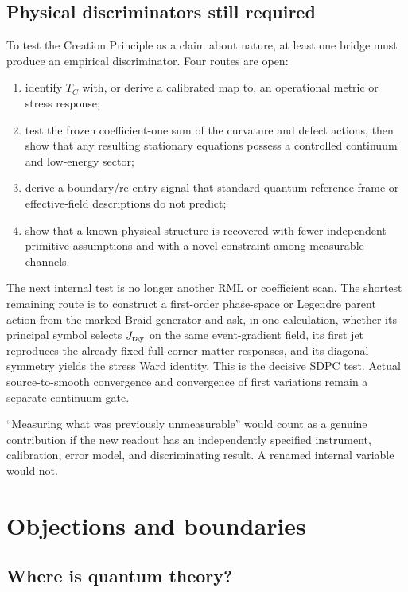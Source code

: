\documentclass[11pt]{article}
\theoremstyle{definition}
\theoremstyle{remark}
\begin{document}
\subsection{Physical discriminators still required}

To test the Creation Principle as a claim about nature, at least one bridge must produce an empirical discriminator. Four routes are open:
\begin{enumerate}
\item identify $T_C$ with, or derive a calibrated map to, an operational metric or stress response;
\item test the frozen coefficient-one sum of the curvature and defect actions, then show that any resulting stationary equations possess a controlled continuum and low-energy sector;
\item derive a boundary/re-entry signal that standard quantum-reference-frame or effective-field descriptions do not predict;
\item show that a known physical structure is recovered with fewer independent primitive assumptions and with a novel constraint among measurable channels.
\end{enumerate}

The next internal test is no longer another RML or coefficient scan. The shortest remaining route is to construct a first-order phase-space or Legendre parent action from the marked Braid generator and ask, in one calculation, whether its principal symbol selects $J_{\rm ray}$ on the same event-gradient field, its first jet reproduces the already fixed full-corner matter responses, and its diagonal symmetry yields the stress Ward identity. This is the decisive SDPC test. Actual source-to-smooth convergence and convergence of first variations remain a separate continuum gate.

``Measuring what was previously unmeasurable'' would count as a genuine contribution if the new readout has an independently specified instrument, calibration, error model, and discriminating result. A renamed internal variable would not.

\section{Objections and boundaries}

\subsection{Where is quantum theory?}
\end{document}
